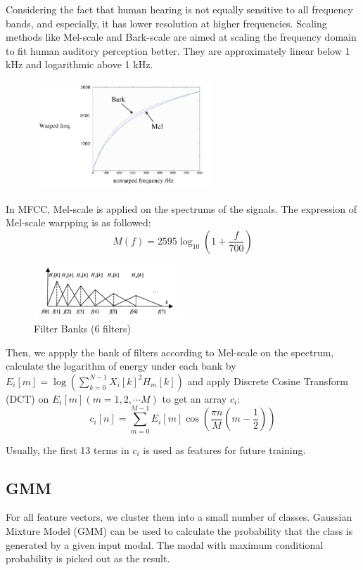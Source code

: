 Considering the fact that human hearing is not equally sensitive to all frequency bands, and especially, it has lower resolution at higher frequencies.
Scaling methods like Mel-scale and Bark-scale are aimed at scaling the frequency domain to fit human auditory perception better.
They are approximately linear below 1 kHz and logarithmic above 1 kHz.
\begin{figure}[H]
  \centering
  \includegraphics[width=0.6\textwidth]{res/mel-scale.png}
\end{figure}

In MFCC, Mel-scale is applied on the spectrums of the signals. The expression of Mel-scale warpping is as followed:
\[ M(f) = 2595 \log_{10}(1 + \dfrac{f}{700}) \]

\begin{figure}[H]
  \centering
  \includegraphics[width=0.5\textwidth]{res/bank.png}
  \caption{Filter Banks (6 filters) \label{fig:bank}}
\end{figure}
Then,  we appply the bank of filters according to Mel-scale on the spectrum,
calculate the logarithm of energy under each bank by $E_i[m] = \log (\sum_{k=0}^{N-1}{X_i[k]^2 H_m[k]}) $ and apply Discrete
Cosine Transform (DCT) on $E_i[m](m = 1, 2, \cdots M) $ to get an array $c_i $:
\[ c_i[n] = \sum_{m=0}^{M-1}{E_i[m]\cos(\dfrac{\pi n}{M}(m - \dfrac{1}{2}))} \]

Usually, the first 13 terms in $c_i $ is used as features for future training.

\subsection{GMM}

For all feature vectors, we cluster them into a small number of classes.
Gaussian Mixture Model (GMM) can be used to calculate the probability that the class is generated by a given input modal.
The modal with maximum conditional probability is picked out as the result.
